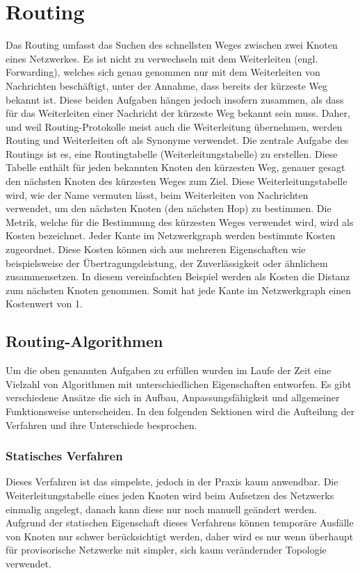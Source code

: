 \chapter{Routing}
Das Routing umfasst das Suchen des schnellsten Weges zwischen zwei Knoten eines Netzwerkes. Es ist nicht zu verwechseln mit dem Weiterleiten (engl. Forwarding), welches sich genau genommen nur mit dem Weiterleiten von Nachrichten beschäftigt, unter der Annahme, dass bereits der kürzeste Weg bekannt ist. Diese beiden Aufgaben hängen jedoch insofern zusammen, als dass für das Weiterleiten einer Nachricht der kürzeste Weg bekannt sein muss. Daher, und weil Routing-Protokolle meist auch die Weiterleitung übernehmen, werden Routing und Weiterleiten oft als Synonyme verwendet. Die zentrale Aufgabe des Routings ist es, eine Routingtabelle (Weiterleitungstabelle) zu erstellen. Diese Tabelle enthält für jeden bekannten Knoten den kürzesten Weg, genauer gesagt den nächsten Knoten des kürzesten Weges zum Ziel. Diese Weiterleitungstabelle wird, wie der Name vermuten lässt, beim Weiterleiten von Nachrichten verwendet, um den nächsten Knoten (den nächsten Hop) zu bestimmen. Die Metrik, welche für die Bestimmung des kürzesten Weges verwendet wird, wird als Kosten bezeichnet. Jeder Kante im Netzwerkgraph werden bestimmte Kosten zugeordnet. Diese Kosten können sich aus mehreren Eigenschaften wie beispielsweise der Übertragungsleistung, der Zuverlässigkeit oder ähnlichem zusammensetzen. In diesem vereinfachten Beispiel werden als Kosten die Distanz zum nächsten Knoten genommen. Somit hat jede Kante im Netzwerkgraph einen Kostenwert von 1.

\section{Routing-Algorithmen}
Um die oben genannten Aufgaben zu erfüllen wurden im Laufe der Zeit eine Vielzahl von Algorithmen mit unterschiedlichen Eigenschaften entworfen. Es gibt verschiedene Ansätze die sich in Aufbau, Anpassungsfähigkeit und allgemeiner Funktionsweise unterscheiden. In den folgenden Sektionen wird die Aufteilung der Verfahren und ihre Unterschiede besprochen.

\subsection{Statisches Verfahren}
Dieses Verfahren ist das simpelste, jedoch in der Praxis kaum anwendbar. Die Weiterleitungstabelle eines jeden Knoten wird beim Aufsetzen des Netzwerks einmalig angelegt, danach kann diese nur noch manuell geändert werden. Aufgrund der statischen Eigenschaft dieses Verfahrens können temporäre Ausfälle von Knoten nur schwer berücksichtigt werden, daher wird es nur wenn überhaupt für provisorische Netzwerke mit simpler, sich kaum verändernder Topologie verwendet.

